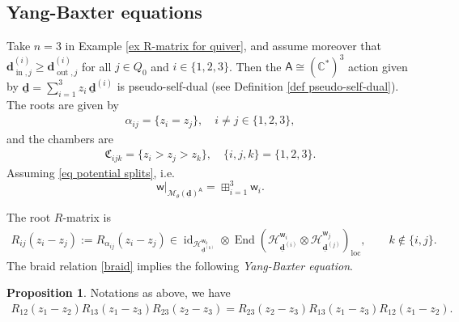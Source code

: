 \documentclass[10pt]{amsart}
\theoremstyle{definition}
\newtheorem{Proposition}[Theorem]{Proposition}
\numberwithin{equation}{section}
\newcommand{\bC}{\mathbb{C}}
\newcommand{\bQ}{\mathbb{Q}}
\newcommand{\bd}{\mathbf{d}}
\newcommand{\cM}{\mathcal{M}}
\newcommand{\fC}{\mathfrak{C}}
\newcommand{\loc}{\mathrm{loc}}
\newcommand{\sA}{\mathsf{A}}
\newcommand{\sw}{\mathsf{w}}
\newcommand{\End}{\operatorname{End}}
\newcommand{\pt}{\operatorname{pt}}
\newcommand{\id}{\operatorname{id}}
\newcommand{\In}{\operatorname{in}}
\newcommand{\Out}{\operatorname{out}}
\begin{document}




\subsection{Yang-Baxter equations}

Take $n=3$ in Example \ref{ex R-matrix for quiver}, and assume moreover that $\bd^{(i)}_{\In,j}\geqslant \bd^{(i)}_{\Out,j}$ for all $j\in Q_0$ and $i\in \{1,2,3\}$. Then the $\sA\cong (\bC^*)^3$ action given by $\underline{\bd}=\sum_{i=1}^3 z_i\,\underline{\bd}^{(i)}$ is pseudo-self-dual (see Definition \ref{def pseudo-self-dual}). The roots are given by 
\begin{align*}
    \alpha_{ij}=\{z_i=z_j\},\quad i\neq j\in \{1,2,3\},
\end{align*}
and the chambers are
\begin{align*}
    \fC_{ijk}=\{z_i>z_j>z_k\}, \quad \{i,j,k\}=\{1,2,3\}.
\end{align*}
Assuming \eqref{eq potential splits}, i.e. $$\sw|_{\cM_\theta(\underline{\bd})^{\sA}}=\boxplus_{i=1}^3\sw_i.$$
  

The root $R$-matrix is 
\begin{align*}
    R_{ij}(z_i-z_j):=R_{\alpha_{ij}}(z_i-z_j)\in \id_{\mathcal H^{\sw_k}_{\underline{\bd}^{(k)}}}\otimes\End\left(\mathcal H^{\sw_i}_{\underline{\bd}^{(i)}}\otimes\mathcal H^{\sw_j}_{\underline{\bd}^{(j)}}\right)_\loc,\qquad k\notin\{i,j\}.
\end{align*}
The braid relation \eqref{braid} implies the following \textit{Yang-Baxter equation}.
\begin{Proposition}
Notations as above, we have 
\begin{align}
    R_{12}(z_1-z_2)R_{13}(z_1-z_3)R_{23}(z_2-z_3)=R_{23}(z_2-z_3)R_{13}(z_1-z_3)R_{12}(z_1-z_2).
\end{align}
\end{Proposition}
\end{document}
